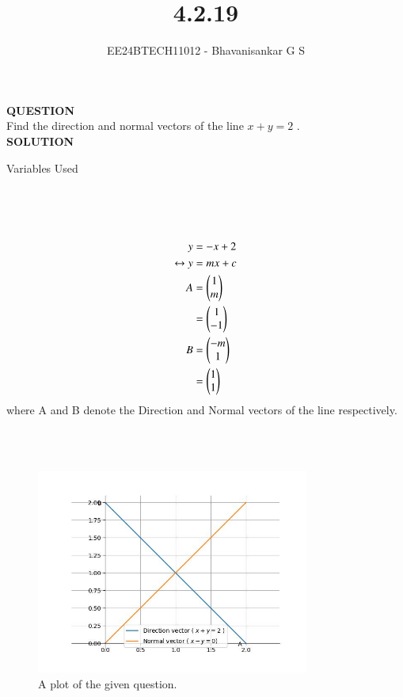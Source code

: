 \documentclass[journal]{IEEEtran}
\begin{document}

\vspace{3cm}

\title{4.2.19}
\author{EE24BTECH11012 - Bhavanisankar G S}
{\let\newpage\relax\maketitle}

\renewcommand{\thefigure}{\theenumi}
\renewcommand{\thetable}{\theenumi}
\setlength{\intextsep}{10pt} %


\renewcommand{\thetable}{\theenumi}

\textbf{QUESTION} \\
Find the direction and normal vectors of the line $x+y=2$ . \\
\textbf{SOLUTION} \\

\begin{table}[h!]
	\centering
        
	\caption{Variables Used}
	\label{tab10.5.3.9.1}
\end{table} \\ \\ \\

\begin{align}
	y &= -x + 2 \\
	\leftrightarrow y &= mx + c \\
	A &= \begin{pmatrix}1 \\ m\end{pmatrix} \\ 
	                 &= \begin{pmatrix}1 \\ -1\end{pmatrix} \\
	B &= \begin{pmatrix} -m \\ 1 \end{pmatrix} \\
	              &= \begin{pmatrix} 1 \\ 1 \end{pmatrix} \\ 
\end{align}
where A and B denote the Direction and Normal vectors of the line respectively.

	 \\
	 \\
	
\begin{figure}[h]
	\centering
	\includegraphics[width=0.8\textwidth]{figs/figure.jpg}
	\caption{A plot of the given question.}
\end{figure}
\end{document}
